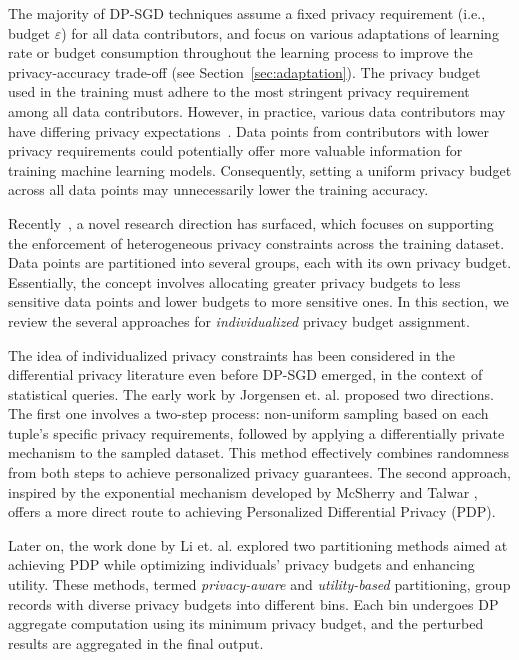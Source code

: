 
The majority of DP-SGD techniques assume a fixed privacy requirement (i.e., budget $\varepsilon$) for all data contributors, and focus on various adaptations of learning rate or budget consumption throughout the learning process to improve the privacy-accuracy trade-off (see Section~\ref{sec:adaptation}). The privacy budget used in the training must adhere to the most stringent privacy requirement among all data contributors. However, in practice, various data contributors may have differing privacy expectations~\cite{userConc}. Data points from contributors with lower privacy requirements could potentially offer more valuable information for training machine learning models. Consequently, setting a uniform privacy budget across all data points may unnecessarily lower the training accuracy.

Recently~\cite{ipate}, a novel research direction has surfaced, which focuses on supporting the enforcement of heterogeneous privacy constraints across the training dataset. Data points are partitioned into several groups, each with its own privacy budget. Essentially, the concept involves allocating greater privacy budgets to less sensitive data points and lower budgets to more sensitive ones. In this section, we review the several approaches for {\em individualized} privacy budget assignment.

The idea of individualized privacy constraints has been considered in the differential privacy literature even before DP-SGD emerged, in the context of statistical queries. The early work by Jorgensen et. al. \cite{Jorgensen2015} proposed two directions. The first one involves a two-step process: non-uniform sampling based on each tuple's specific privacy requirements, followed by applying a differentially private mechanism to the sampled dataset. This method effectively combines randomness from both steps to achieve personalized privacy guarantees. The second approach, inspired by the exponential mechanism developed by McSherry and Talwar \cite{mcsherry2007mechanism}, offers a more direct route to achieving Personalized Differential Privacy (PDP). 

Later on, the work done by Li et. al. \cite{li2017partitioning} explored two partitioning methods aimed at achieving PDP while optimizing individuals' privacy budgets and enhancing utility. These methods, termed {\em privacy-aware} and {\em utility-based} partitioning, group records with diverse privacy budgets into different bins. Each bin undergoes DP aggregate computation using its minimum privacy budget, and the perturbed results are aggregated in the final output.

